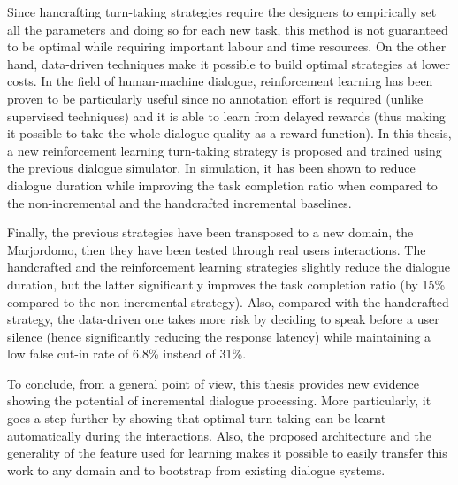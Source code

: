         Since hancrafting turn-taking strategies require the designers to empirically set all the parameters and doing so for each new task, this method is not guaranteed to be optimal while requiring important labour and time resources. On the other hand, data-driven techniques make it possible to build optimal strategies at lower costs. In the field of human-machine dialogue, reinforcement learning has been proven to be particularly useful since no annotation effort is required (unlike supervised techniques) and it is able to learn from delayed rewards (thus making it possible to take the whole dialogue quality as a reward function). In this thesis, a new reinforcement learning turn-taking strategy is proposed and trained using the previous dialogue simulator. In simulation, it has been shown to reduce dialogue duration while improving the task completion ratio when compared to the non-incremental and the handcrafted incremental baselines.

        Finally, the previous strategies have been transposed to a new domain, the Marjordomo, then they have been tested through real users interactions. The handcrafted and the reinforcement learning strategies slightly reduce the dialogue duration, but the latter significantly improves the task completion ratio (by 15\% compared to the non-incremental strategy). Also, compared with the handcrafted strategy, the data-driven one takes more risk by deciding to speak before a user silence (hence significantly reducing the response latency) while maintaining a low false cut-in rate of 6.8\% instead of 31\%.

        To conclude, from a general point of view, this thesis provides new evidence showing the potential of incremental dialogue processing. More particularly, it goes a step further by showing that optimal turn-taking can be learnt automatically during the interactions. Also, the proposed architecture and the generality of the feature used for learning makes it possible to easily transfer this work to any domain and to bootstrap from existing dialogue systems.
        


        
	
	
